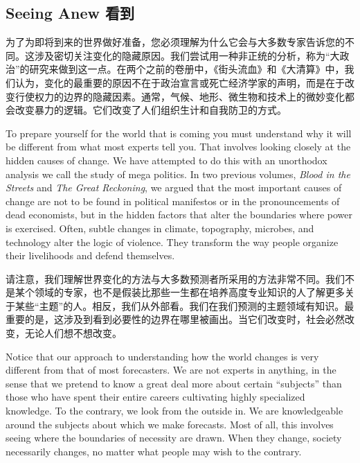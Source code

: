 \subsection{Seeing Anew 看到}
\begin{paracol}{2}
为了为即将到来的世界做好准备，您必须理解为什么它会与大多数专家告诉您的不同。这涉及密切关注变化的隐藏原因。我们尝试用一种非正统的分析，称为“大政治”的研究来做到这一点。在两个之前的卷册中，《街头流血》和《大清算》中，我们认为，变化的最重要的原因不在于政治宣言或死亡经济学家的声明，而是在于改变行使权力的边界的隐藏因素。通常，气候、地形、微生物和技术上的微妙变化都会改变暴力的逻辑。它们改变了人们组织生计和自我防卫的方式。

\switchcolumn

To prepare yourself for the world that is coming you must understand why it will be different from what most experts tell you. That involves looking closely at the hidden causes of change. We have attempted to do this with an unorthodox analysis we call the study of mega politics. In two previous volumes, \emph{Blood in the Streets} and \emph{The Great Reckoning}, we argued that the most important causes of change are not to be found in political manifestos or in the pronouncements of dead economists, but in the hidden factors that alter the boundaries where power is exercised. Often, subtle changes in climate, topography, microbes, and technology alter the logic of violence. They transform the way people organize their livelihoods and defend themselves.

\switchcolumn*
请注意，我们理解世界变化的方法与大多数预测者所采用的方法非常不同。我们不是某个领域的专家，也不是假装比那些一生都在培养高度专业知识的人了解更多关于某些“主题”的人。相反，我们从外部看。我们在我们预测的主题领域有知识。最重要的是，这涉及到看到必要性的边界在哪里被画出。当它们改变时，社会必然改变，无论人们想不想改变。

\switchcolumn
Notice that our approach to understanding how the world changes is very different from that of most forecasters. We are not experts in anything, in the sense that we pretend to know a great deal more about certain ``subjects'' than those who have spent their entire careers cultivating highly specialized knowledge. To the contrary, we look from the outside in. We are knowledgeable around the subjects about which we make forecasts. Most of all, this involves seeing where the boundaries of necessity are drawn. When they change, society necessarily changes, no matter what people may wish to the contrary.  


\end{paracol}
